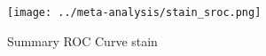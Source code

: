 \begin{figure}[p]
\centering

\texttt{[image: ../meta-analysis/stain\_sroc.png]}

\caption[Summary ROC Curve stain]{Summary ROC Curve stain}
\label{fig:stain_sroc}
\end{figure}
